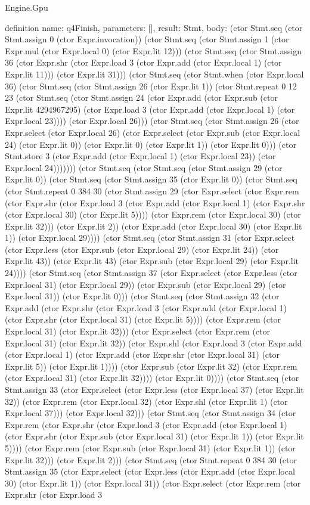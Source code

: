 \begin{lexlean}{Engine.Gpu}
\begin{semanticmodule}
definition{
  name: q4Finish,
  parameters: [],
  result: Stmt,
  body: (ctor Stmt.seq (ctor Stmt.assign 0 (ctor Expr.invocation)) (ctor Stmt.seq (ctor Stmt.assign 1 (ctor Expr.mul (ctor Expr.local 0) (ctor Expr.lit 12))) (ctor Stmt.seq (ctor Stmt.assign 36 (ctor Expr.shr (ctor Expr.load 3 (ctor Expr.add (ctor Expr.local 1) (ctor Expr.lit 11))) (ctor Expr.lit 31))) (ctor Stmt.seq (ctor Stmt.when (ctor Expr.local 36) (ctor Stmt.seq (ctor Stmt.assign 26 (ctor Expr.lit 1)) (ctor Stmt.repeat 0 12 23 (ctor Stmt.seq (ctor Stmt.assign 24 (ctor Expr.add (ctor Expr.sub (ctor Expr.lit 4294967295) (ctor Expr.load 3 (ctor Expr.add (ctor Expr.local 1) (ctor Expr.local 23)))) (ctor Expr.local 26))) (ctor Stmt.seq (ctor Stmt.assign 26 (ctor Expr.select (ctor Expr.local 26) (ctor Expr.select (ctor Expr.sub (ctor Expr.local 24) (ctor Expr.lit 0)) (ctor Expr.lit 0) (ctor Expr.lit 1)) (ctor Expr.lit 0))) (ctor Stmt.store 3 (ctor Expr.add (ctor Expr.local 1) (ctor Expr.local 23)) (ctor Expr.local 24))))))) (ctor Stmt.seq (ctor Stmt.seq (ctor Stmt.assign 29 (ctor Expr.lit 0)) (ctor Stmt.seq (ctor Stmt.assign 35 (ctor Expr.lit 0)) (ctor Stmt.seq (ctor Stmt.repeat 0 384 30 (ctor Stmt.assign 29 (ctor Expr.select (ctor Expr.rem (ctor Expr.shr (ctor Expr.load 3 (ctor Expr.add (ctor Expr.local 1) (ctor Expr.shr (ctor Expr.local 30) (ctor Expr.lit 5)))) (ctor Expr.rem (ctor Expr.local 30) (ctor Expr.lit 32))) (ctor Expr.lit 2)) (ctor Expr.add (ctor Expr.local 30) (ctor Expr.lit 1)) (ctor Expr.local 29)))) (ctor Stmt.seq (ctor Stmt.assign 31 (ctor Expr.select (ctor Expr.less (ctor Expr.sub (ctor Expr.local 29) (ctor Expr.lit 24)) (ctor Expr.lit 43)) (ctor Expr.lit 43) (ctor Expr.sub (ctor Expr.local 29) (ctor Expr.lit 24)))) (ctor Stmt.seq (ctor Stmt.assign 37 (ctor Expr.select (ctor Expr.less (ctor Expr.local 31) (ctor Expr.local 29)) (ctor Expr.sub (ctor Expr.local 29) (ctor Expr.local 31)) (ctor Expr.lit 0))) (ctor Stmt.seq (ctor Stmt.assign 32 (ctor Expr.add (ctor Expr.shr (ctor Expr.load 3 (ctor Expr.add (ctor Expr.local 1) (ctor Expr.shr (ctor Expr.local 31) (ctor Expr.lit 5)))) (ctor Expr.rem (ctor Expr.local 31) (ctor Expr.lit 32))) (ctor Expr.select (ctor Expr.rem (ctor Expr.local 31) (ctor Expr.lit 32)) (ctor Expr.shl (ctor Expr.load 3 (ctor Expr.add (ctor Expr.local 1) (ctor Expr.add (ctor Expr.shr (ctor Expr.local 31) (ctor Expr.lit 5)) (ctor Expr.lit 1)))) (ctor Expr.sub (ctor Expr.lit 32) (ctor Expr.rem (ctor Expr.local 31) (ctor Expr.lit 32)))) (ctor Expr.lit 0)))) (ctor Stmt.seq (ctor Stmt.assign 33 (ctor Expr.select (ctor Expr.less (ctor Expr.local 37) (ctor Expr.lit 32)) (ctor Expr.rem (ctor Expr.local 32) (ctor Expr.shl (ctor Expr.lit 1) (ctor Expr.local 37))) (ctor Expr.local 32))) (ctor Stmt.seq (ctor Stmt.assign 34 (ctor Expr.rem (ctor Expr.shr (ctor Expr.load 3 (ctor Expr.add (ctor Expr.local 1) (ctor Expr.shr (ctor Expr.sub (ctor Expr.local 31) (ctor Expr.lit 1)) (ctor Expr.lit 5)))) (ctor Expr.rem (ctor Expr.sub (ctor Expr.local 31) (ctor Expr.lit 1)) (ctor Expr.lit 32))) (ctor Expr.lit 2))) (ctor Stmt.seq (ctor Stmt.repeat 0 384 30 (ctor Stmt.assign 35 (ctor Expr.select (ctor Expr.less (ctor Expr.add (ctor Expr.local 30) (ctor Expr.lit 1)) (ctor Expr.local 31)) (ctor Expr.select (ctor Expr.rem (ctor Expr.shr (ctor Expr.load 3 }
\end{semanticmodule}
\end{lexlean}
